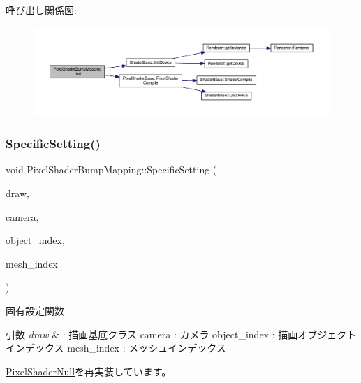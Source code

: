 呼び出し関係図\+:
\nopagebreak
\begin{figure}[H]
\begin{center}
\leavevmode
\includegraphics[width=350pt]{class_pixel_shader_bump_mapping_ab7807b7c56242e965ddb23e66e1a5d9e_cgraph}
\end{center}
\end{figure}
\mbox{\label{class_pixel_shader_bump_mapping_afa80c2404b490a444d54cc47c681ca8f}} 
\subsubsection{\texorpdfstring{Specific\+Setting()}{SpecificSetting()}}
{\footnotesize\ttfamily void Pixel\+Shader\+Bump\+Mapping\+::\+Specific\+Setting (\begin{DoxyParamCaption}\item[{\mbox{\hyperlink{class_draw_base}{Draw\+Base}} $\ast$}]{draw,  }\item[{\mbox{\hyperlink{class_camera}{Camera}} $\ast$}]{camera,  }\item[{unsigned}]{object\+\_\+index,  }\item[{unsigned}]{mesh\+\_\+index }\end{DoxyParamCaption})\hspace{0.3cm}{\ttfamily [virtual]}}



固有設定関数 


\begin{DoxyParams}{引数}
{\em draw} & \+: 描画基底クラス camera \+: カメラ object\+\_\+index \+: 描画オブジェクトインデックス mesh\+\_\+index \+: メッシュインデックス \\
\hline
\end{DoxyParams}


\mbox{\hyperlink{class_pixel_shader_null_a8dd0194b5a22da5261ab35233a7cfdcd}{Pixel\+Shader\+Null}}を再実装しています。



